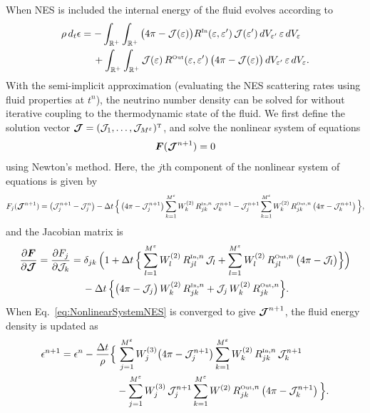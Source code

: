 \documentclass[10pt,preprint]{aastex}
\begin{document}
When NES is included the internal energy of the fluid evolves according to
\begin{align}
  \rho\,d_{t}\epsilon
  &=-\int_{\mathbb{R}^{+}}\int_{\mathbb{R}^{+}}\big(4\pi-\mathcal{J}(\varepsilon)\big)R^{\mbox{\tiny In}}(\varepsilon,\varepsilon')\,\mathcal{J}(\varepsilon')\,dV_{\varepsilon'}\,\varepsilon\,dV_{\varepsilon} \\
  &\hspace{12pt}
  +\int_{\mathbb{R}^{+}}\int_{\mathbb{R}^{+}}\mathcal{J}(\varepsilon)\,R^{\mbox{\tiny Out}}(\varepsilon,\varepsilon')\,\big(4\pi-\mathcal{J}(\varepsilon)\big)\,dV_{\varepsilon'}\,\varepsilon\,dV_{\varepsilon}.  
\end{align}
With the semi-implicit approximation (evaluating the NES scattering rates using fluid properties at $t^{n}$), the neutrino number density can be solved for without iterative coupling to the thermodynamic state of the fluid.  
We first define the solution vector $\boldsymbol{\mathcal{J}}=(\mathcal{J}_{1},\ldots,\mathcal{J}_{M^{\varepsilon}})^{\mbox{\tiny T}}$, and solve the nonlinear system of equations
\begin{equation}
  \boldsymbol{F}(\boldsymbol{\mathcal{J}}^{n+1})=0
  \label{eq:NonlinearSystemNES}
\end{equation}
using Newton's method.  
Here, the $j$th component of the nonlinear system of equations is given by
\begin{equation}
  F_{j}(\boldsymbol{\mathcal{J}}^{n+1})
  =\big(\mathcal{J}_{j}^{n+1}-\mathcal{J}_{j}^{n}\big)
  -\Delta t\,\Big\{\,
    \big(4\pi-\mathcal{J}_{j}^{n+1}\big)\sum_{k=1}^{M^{\varepsilon}}W_{k}^{(2)}\,R_{jk}^{\mbox{\tiny In},n}\,\mathcal{J}_{k}^{n+1}
    -\mathcal{J}_{j}^{n+1}\sum_{k=1}^{M^{\varepsilon}}W_{k}^{(2)}\,R_{jk}^{\mbox{\tiny Out},n}\,\big(4\pi-\mathcal{J}_{k}^{n+1}\big)\,\Big\},
\end{equation}
and the Jacobian matrix is
\begin{align}
  \frac{\partial \boldsymbol{F}}{\partial \boldsymbol{\mathcal{J}}}
  =\frac{\partial F_{j}}{\partial \mathcal{J}_{k}}
  &=\delta_{jk}\,\Big(1+\Delta t\,\Big\{\sum_{l=1}^{M^{\varepsilon}}W_{l}^{(2)}\,R_{jl}^{\mbox{\tiny In},n}\,\mathcal{J}_{l}
  +\sum_{l=1}^{M^{\varepsilon}}W_{l}^{(2)}\,R_{jl}^{\mbox{\tiny Out},n}\,\big(4\pi-\mathcal{J}_{l}\big)\Big\}\Big) \nonumber \\
  &\hspace{12pt}
  -\Delta t\,\Big\{\big(4\pi-\mathcal{J}_{j}\big)\,W_{k}^{(2)}\,R_{jk}^{\mbox{\tiny In},n}+\mathcal{J}_{j}\,W_{k}^{(2)}\,R_{jk}^{\mbox{\tiny Out},n}\Big\}.
\end{align}
When Eq.~\eqref{eq:NonlinearSystemNES} is converged to give $\boldsymbol{\mathcal{J}}^{n+1}$, the fluid energy density is updated as
\begin{align}
  \epsilon^{n+1}
  &=\epsilon^{n}-\frac{\Delta t}{\rho}
  \Big\{\,
    \sum_{j=1}^{M^{\varepsilon}}W_{j}^{(3)}\big(4\pi-\mathcal{J}_{j}^{n+1}\big)
    \sum_{k=1}^{M^{\varepsilon}}W_{k}^{(2)}\,R_{jk}^{\mbox{\tiny In},n}\,\mathcal{J}_{k}^{n+1} \nonumber \\
    &\hspace{56pt}
    -\sum_{j=1}^{M^{\varepsilon}}W_{j}^{(3)}\,\mathcal{J}_{j}^{n+1}
    \sum_{k=1}^{M^{\varepsilon}}W^{(2)}\,R_{jk}^{\mbox{\tiny Out},n}\,\big(4\pi-\mathcal{J}_{k}^{n+1}\big)
  \,\Big\}.
\end{align}
\end{document}
